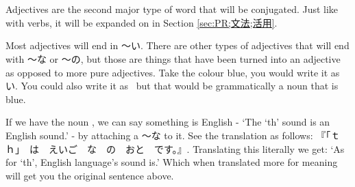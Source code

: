\section[形容詞]{}\label{sec:PR;文法;形容詞}

Adjectives are the second major type of word that will be conjugated. Just like with verbs, it will be expanded on in Section \ref{sec:PR;文法;活用}.

Most adjectives will end in 〜い. There are other types of adjectives that will end with 〜な or 〜の, but those are things that have been turned into an adjective as opposed to more pure adjectives. Take the colour blue, you would write it as い. You could also write it as ~but that would be grammatically a noun that is blue.

If we have the noun , we can say something is English - `The `th' sound is an English sound.' - by attaching a 〜な to it. See the translation as follows: 『「ｔｈ」　は　えいご　な　の　おと　です。』. Translating this literally we get: `As for `th', English language's sound is.' Which when translated more for meaning will get you the original sentence above.
